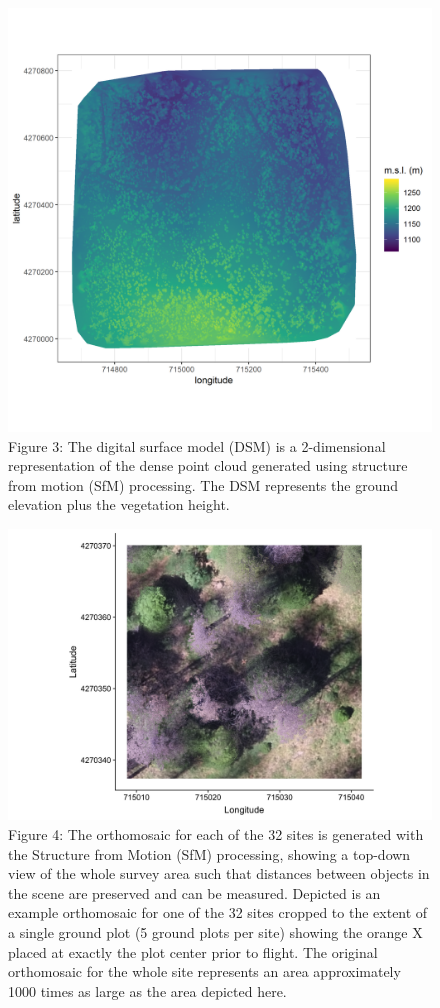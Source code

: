 \documentclass[]{article}
\begin{document}
\begin{figure}
\centering
\includegraphics{../../figures/eldo_3k_3_dsm.png}
\caption{Figure 3: The digital surface model (DSM) is a 2-dimensional
representation of the dense point cloud generated using structure from
motion (SfM) processing. The DSM represents the ground elevation plus
the vegetation height.}
\end{figure}

\begin{figure}
\centering
\includegraphics{../../figures/eldo_3k_3_2_ortho-rgb.png}
\caption{Figure 4: The orthomosaic for each of the 32 sites is generated
with the Structure from Motion (SfM) processing, showing a top-down view
of the whole survey area such that distances between objects in the
scene are preserved and can be measured. Depicted is an example
orthomosaic for one of the 32 sites cropped to the extent of a single
ground plot (5 ground plots per site) showing the orange X placed at
exactly the plot center prior to flight. The original orthomosaic for
the whole site represents an area approximately 1000 times as large as
the area depicted here.}
\end{figure}
\end{document}
